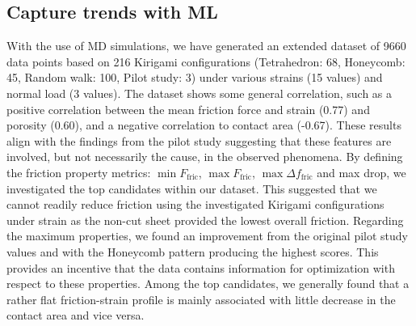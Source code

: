 \subsection{Capture trends with ML}
With the use of \acrshort{MD} simulations, we have generated an extended dataset
of 9660 data points based on 216 Kirigami configurations (Tetrahedron: 68,
Honeycomb: 45, Random walk: 100, Pilot study: 3) under various strains (15
values) and normal load (3 values). The dataset shows some general correlation,
such as a positive correlation between the mean friction force and strain (0.77)
and porosity (0.60), and a negative correlation to contact area (-0.67). These
results align with the findings from the pilot study suggesting that these
features are involved, but not necessarily the cause, in the observed phenomena.
By defining the friction property metrics: $\min F_{\text{fric}}$,  $\max
F_{\text{fric}}$, $\max \Delta f_{\text{fric}}$ and max drop, we investigated
the top candidates within our dataset. This suggested that we cannot readily
reduce friction using the investigated Kirigami configurations under strain as
the non-cut sheet provided the lowest overall friction. Regarding the maximum
properties, we found an improvement from the original pilot study values and
with the Honeycomb pattern producing the highest scores. This provides an
incentive that the data contains information for optimization with respect to
these properties. Among the top candidates, we generally found that a rather
flat friction-strain profile is mainly associated with little decrease in the
contact area and vice versa. 

